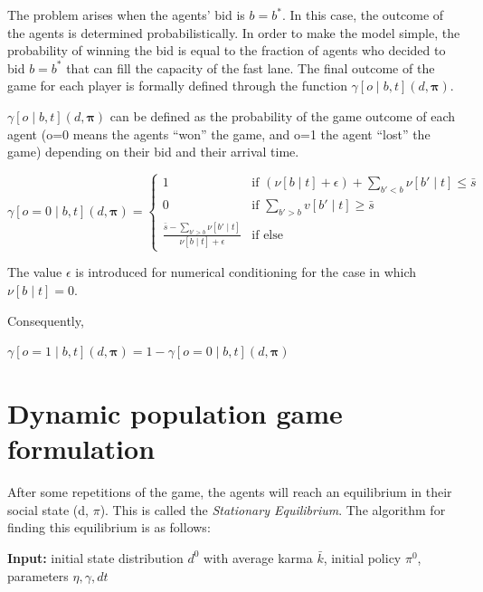 \documentclass[a4paper,11pt,twoside]{book}
\begin{document}
The problem arises when the agents' bid is $b=b^*$. In this case, the outcome of the agents is determined probabilistically. In order to make the model simple, the probability of winning the bid is equal to the fraction of agents who decided to bid $b=b^*$ that can fill the capacity of the fast lane. The final outcome of the game for each player is formally defined through the function $\gamma[o \mid b,t](d,\bm{\pi})$.

$\gamma[o \mid b,t](d,\bm{\pi})$ can be defined as the probability of the game outcome of each agent (o=0 means the agents ``won'' the game, and o=1 the agent ``lost'' the game) depending on their bid and their arrival time. 

\begin{equation}
    \gamma[o = 0 \mid b,t](d,\bm{\pi}) = \begin{cases}
        1 & \text{if } (\nu[b \mid t] + \epsilon) + \sum_{b'<b} \nu[b' \mid t] \leq \bar{s} \\
        0 & \text{if } \sum_{b'>b} v[b' \mid t] \geq \bar{s} \\
        \frac{\bar{s} - \sum_{b'>b}\nu[b' \mid t]}{\nu[b \mid t] + \epsilon} & \text{if else}
    \end{cases}
\end{equation}

The value $\epsilon$ is introduced for numerical conditioning for the case in which $\nu[b \mid t] = 0$.

Consequently,  
\begin{center}
    $\gamma[o = 1 \mid b,t](d,\bm{\pi}) = 1 - \gamma[o = 0 \mid b,t](d,\bm{\pi})$
\end{center}







\newpage
\section{Dynamic population game formulation}

After some repetitions of the game, the agents will reach an equilibrium in their social state (d, $\pi$). This is called the \textit{Stationary Equilibrium}. The algorithm for finding this equilibrium is as follows:

\textbf{Input:} initial state distribution $d^0$ with average karma $\bar k$, initial policy $\pi ^0$, parameters $\eta, \gamma, dt$ 
\end{document}

